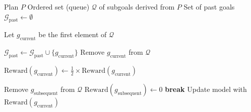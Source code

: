 \begin{algorithm}[H]
\caption{Training routine with the crafted reward function.}
\label{alg:reward_func}
\begin{algorithmic}[1]
\STATE Plan $P$
\STATE Ordered set (queue) $\mathcal{Q}$ of subgoals derived from $P$
\STATE Set of past goals $\mathcal{G}_{\text{past}} \gets \emptyset$

    \STATE Let $g_{\text{current}}$ be the first element of $\mathcal{Q}$
    
        \STATE $\mathcal{G}_{\text{past}} \gets \mathcal{G}_{\text{past}} \cup \{ g_{\text{current}} \}$
        \STATE Remove $g_{\text{current}}$ from $\mathcal{Q}$
        
            \STATE $\text{Reward}(g_{\text{current}}) \gets \frac{1}{2} \times \text{Reward}(g_{\text{current}})$
        \ENDIF
        
                \STATE Remove $g_{\text{subsequent}}$ from $\mathcal{Q}$
                \STATE $\text{Reward}(g_{\text{subsequent}}) \gets 0$
            \ELSE
                \STATE \textbf{break}
            \ENDIF
        \ENDFOR
    \ELSE
        \STATE Update model with $\text{Reward}(g_{\text{current}})$
    \ENDIF
\ENDWHILE
\end{algorithmic}
\end{algorithm}


